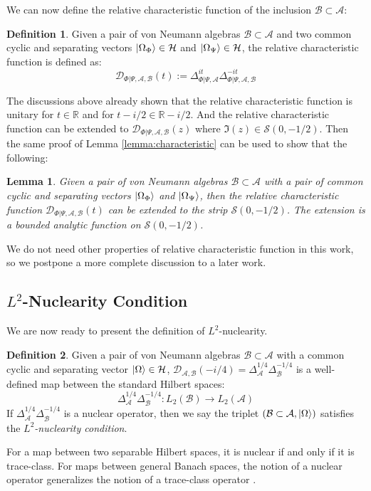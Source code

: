 \documentclass[a4paper,11pt]{article}
\newtheorem{lemma}[theorem]{Lemma}
\theoremstyle{definition}
\newtheorem{definition}{Definition}[section]
\begin{document}
We can now define the relative characteristic function of the inclusion $\mathcal{B}\subset\mathcal{A}$:
\begin{definition}
    Given a pair of von Neumann algebras $\mathcal{B}\subset\mathcal{A}$ and two common cyclic and separating vectors $\ket{\Omega_\Phi}\in\mathcal{H}$ and $\ket{\Omega_\Psi}\in\mathcal{H}$, the relative characteristic function is defined as:
    \begin{equation}
        \mathcal{D}_{\Phi|\Psi,\mathcal{A},\mathcal{B}}(t) := \Delta_{\Phi|\Psi,\mathcal{A}}^{it}\Delta_{\Phi|\Psi,\mathcal{A},\mathcal{B}}^{-it}
    \end{equation}
\end{definition}
The discussions above already shown that the relative characteristic function is unitary for $t\in\mathbb{R}$ and for $t-i/2\in\mathbb{R}-i/2$. And the relative characteristic function can be extended to $\mathcal{D}_{\Phi|\Psi,\mathcal{A},\mathcal{B}}(z)$ where $\Im(z) \in \mathcal{S}(0,-1/2)$. Then the same proof of Lemma \ref{lemma:characteristic} can be used to show that the following:
\begin{lemma}
    Given a pair of von Neumann algebras $\mathcal{B}\subset\mathcal{A}$ with a pair of common cyclic and separating vectors $\ket{\Omega_\Phi}$ and $\ket{\Omega_\Psi}$, then the relative characteristic function $\mathcal{D}_{\Phi|\Psi,\mathcal{A},\mathcal{B}}(t)$ can be extended to the strip $\mathcal{S}(0,-1/2)$. The extension is a bounded analytic function on $\mathcal{S}(0,-1/2)$.
\end{lemma}
We do not need other properties of relative characteristic function in this work, so we postpone a more complete discussion to a later work.
\subsection{$L^2$-Nuclearity Condition}\label{subsection:l2nuclearity}
We are now ready to present the definition of $L^2$-nuclearity.
\begin{definition}
    Given a pair of von Neumann algebras $\mathcal{B}\subset\mathcal{A}$ with a common cyclic and separating vector $\ket{\Omega}\in\mathcal{H}$, $\mathcal{D}_{\mathcal{A}, \mathcal{B}}(-i/4) = \Delta_\mathcal{A}^{1/4}\Delta_\mathcal{B}^{-1/4}$ is a well-defined map between the standard Hilbert spaces:
    \begin{equation}
        \Delta_\mathcal{A}^{1/4}\Delta_\mathcal{B}^{-1/4}: L_2(\mathcal{B})\rightarrow L_2(\mathcal{A})
    \end{equation} 
    If $\Delta_\mathcal{A}^{1/4}\Delta_\mathcal{B}^{-1/4}$ is a nuclear operator, then we say the triplet $(\mathcal{B}\subset\mathcal{A}, \ket{\Omega})$ satisfies the \textit{$L^2$-nuclearity condition}.
\end{definition}
For a map between two separable Hilbert spaces, it is nuclear if and only if it is trace-class. For maps between general Banach spaces, the notion of a nuclear operator generalizes the notion of a trace-class operator \cite{nuclearandsumming}.
\end{document}
